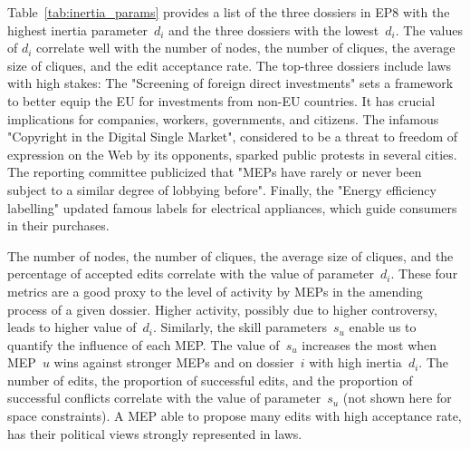 Table~\ref{tab:inertia_params} provides a list of the three dossiers in EP8 with the highest inertia parameter~$d_i$ and the three dossiers with the lowest~$ d_i $.
The values of $d_i$ correlate well with the number of nodes, the number of cliques, the average size of cliques, and the edit acceptance rate.
The top-three dossiers include laws with high stakes:
The "Screening of foreign direct investments" sets a framework to better equip the EU for investments from non-EU countries.
It has crucial implications for companies, workers, governments, and citizens.
The infamous "Copyright in the Digital Single Market", considered to be a threat to freedom of expression on the Web by its opponents, sparked public protests in several cities.
The reporting committee publicized that "MEPs have rarely or never been subject to a similar degree of lobbying before"\cite{europarl2019questions}.
Finally, the "Energy efficiency labelling" updated famous labels for electrical appliances, which guide consumers in their purchases.

The number of nodes, the number of cliques, the average size of cliques, and the percentage of accepted edits correlate with the value of parameter~$ d_i$.
These four metrics are a good proxy to the level of activity by MEPs in the amending process of a given dossier.
Higher activity, possibly due to higher controversy, leads to higher value of~$d_i$.
Similarly, the skill parameters~$s_u$ enable us to quantify the influence of each MEP.
The value of~$s_u$ increases the most when MEP~$u$ wins against stronger MEPs and on dossier~$i$ with high inertia~$d_i$.
The number of edits, the proportion of successful edits, and the proportion of successful conflicts correlate with the value of parameter~$s_u$ (not shown here for space constraints).
A MEP able to propose many edits with high acceptance rate, has their political views strongly represented in laws.



